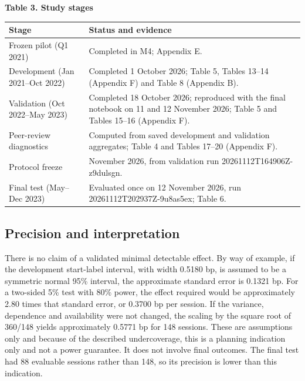 \documentclass[11pt,a4paper]{article}
\newlength{\tablecontentwidth}
\begin{document}
\par\addvspace{8pt}\noindent\begin{minipage}{\linewidth}
\textbf{Table 3. Study stages}\par\vspace{5pt}
\begingroup\fontsize{9.5}{11.7}\selectfont
\renewcommand{\arraystretch}{1.12}
\setlength{\tablecontentwidth}{\dimexpr\linewidth-2\tabcolsep\relax}
\noindent\begin{tabular}{@{}>{\RaggedRight\arraybackslash}p{0.32\tablecontentwidth}>{\RaggedRight\arraybackslash}p{0.68\tablecontentwidth}@{}}
\toprule
\textbf{Stage} & \textbf{Status and evidence} \\[3pt]
\midrule
Frozen pilot (Q1 2021) & Completed in M4; Appendix E. \\[3pt]
Development (Jan 2021--Oct 2022) & Completed 1 October 2026; Table 5, Tables 13--14 (Appendix F) and Table 8 (Appendix B). \\[3pt]
Validation (Oct 2022--May 2023) & Completed 18 October 2026; reproduced with the final notebook on 11 and 12 November 2026; Table 5 and Tables 15--16 (Appendix F). \\[3pt]
Peer-review diagnostics & Computed from saved development and validation aggregates; Table 4 and Tables 17--20 (Appendix F). \\[3pt]
Protocol freeze & 12 November 2026, from validation run 20261112T164906Z-z9dulsgn. \\[3pt]
Final test (May--Dec 2023) & Evaluated once on 12 November 2026, run 20261112T202937Z-9u8as5ex; Table 6. \\[3pt]
\bottomrule\end{tabular}
\endgroup
\end{minipage}\par\addvspace{8pt}

\subsection*{Precision and interpretation}

There is no claim of a validated minimal detectable effect. By way of example, if the development start-label interval, with width 0.5180 bp, is assumed to be a symmetric normal 95\% interval, the approximate standard error is 0.1321 bp. For a two-sided 5\% test with 80\% power, the effect required would be approximately 2.80 times that standard error, or 0.3700 bp per session. If the variance, dependence and availability were not changed, the scaling by the square root of 360/148 yields approximately 0.5771 bp for 148 sessions. These are assumptions only and because of the described undercoverage, this is a planning indication only and not a power guarantee. It does not involve final outcomes. The final test had 88 evaluable sessions rather than 148, so its precision is lower than this indication.
\end{document}
